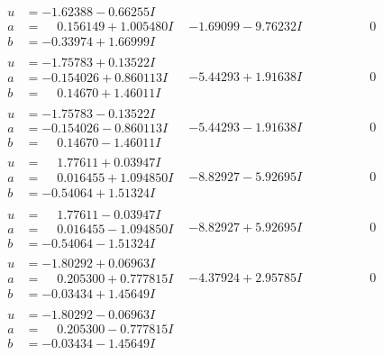 \documentclass[1p]{elsarticle_modified}
\theoremstyle{definition}
\begin{document}
$$\begin{array}{c|c|c}
 \hline 
\begin{aligned}
u &= -1.62388 - 0.66255 I \\
a &= \phantom{-}0.156149 + 1.005480 I \\
b &= -0.33974 + 1.66999 I\end{aligned}
 & -1.69099 - 9.76232 I & \phantom{-0.000000 } 0 \\ \hline\begin{aligned}
u &= -1.75783 + 0.13522 I \\
a &= -0.154026 + 0.860113 I \\
b &= \phantom{-}0.14670 + 1.46011 I\end{aligned}
 & -5.44293 + 1.91638 I & \phantom{-0.000000 } 0 \\ \hline\begin{aligned}
u &= -1.75783 - 0.13522 I \\
a &= -0.154026 - 0.860113 I \\
b &= \phantom{-}0.14670 - 1.46011 I\end{aligned}
 & -5.44293 - 1.91638 I & \phantom{-0.000000 } 0 \\ \hline\begin{aligned}
u &= \phantom{-}1.77611 + 0.03947 I \\
a &= \phantom{-}0.016455 + 1.094850 I \\
b &= -0.54064 + 1.51324 I\end{aligned}
 & -8.82927 - 5.92695 I & \phantom{-0.000000 } 0 \\ \hline\begin{aligned}
u &= \phantom{-}1.77611 - 0.03947 I \\
a &= \phantom{-}0.016455 - 1.094850 I \\
b &= -0.54064 - 1.51324 I\end{aligned}
 & -8.82927 + 5.92695 I & \phantom{-0.000000 } 0 \\ \hline\begin{aligned}
u &= -1.80292 + 0.06963 I \\
a &= \phantom{-}0.205300 + 0.777815 I \\
b &= -0.03434 + 1.45649 I\end{aligned}
 & -4.37924 + 2.95785 I & \phantom{-0.000000 } 0 \\ \hline\begin{aligned}
u &= -1.80292 - 0.06963 I \\
a &= \phantom{-}0.205300 - 0.777815 I \\
b &= -0.03434 - 1.45649 I\end{aligned}

\end{array}$$
\end{document}
